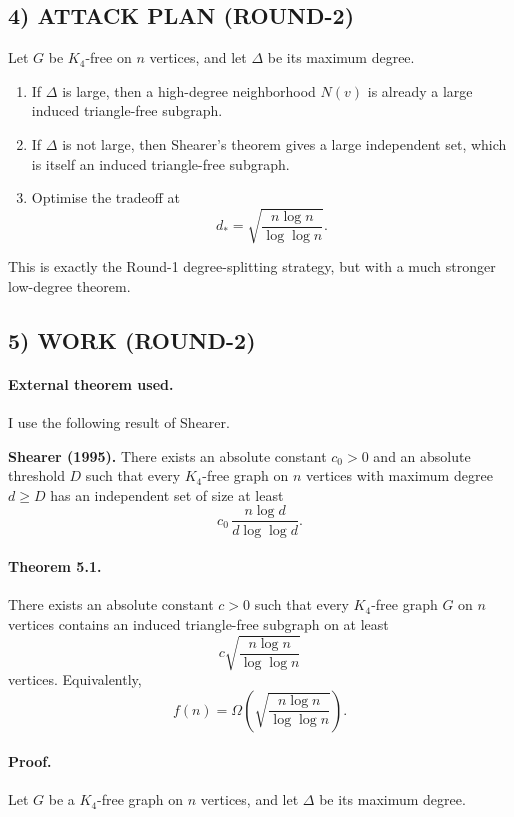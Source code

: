 \subsection*{4) ATTACK PLAN (ROUND-2)}

Let $G$ be $K_4$-free on $n$ vertices, and let $\Delta$ be its maximum degree.

\begin{enumerate}
\item If $\Delta$ is large, then a high-degree neighborhood $N(v)$ is already a large induced triangle-free subgraph.
\item If $\Delta$ is not large, then Shearer's theorem gives a large independent set, which is itself an induced triangle-free subgraph.
\item Optimise the tradeoff at
\[
d_\ast=\sqrt{\frac{n\log n}{\log\log n}}.
\]
\end{enumerate}

This is exactly the Round-1 degree-splitting strategy, but with a much stronger low-degree theorem.

\subsection*{5) WORK (ROUND-2)}

\paragraph{External theorem used.}
I use the following result of Shearer.

\medskip
\noindent
\textbf{Shearer (1995).}
There exists an absolute constant $c_0>0$ and an absolute threshold $D$ such that every $K_4$-free graph on $n$ vertices with maximum degree $d\ge D$ has an independent set of size at least
\[
c_0\,\frac{n\log d}{d\log\log d}.
\]

\paragraph{Theorem 5.1.}
There exists an absolute constant $c>0$ such that every $K_4$-free graph $G$ on $n$ vertices contains an induced triangle-free subgraph on at least
\[
c\sqrt{\frac{n\log n}{\log\log n}}
\]
vertices. Equivalently,
\[
f(n)=\Omega\!\left(\sqrt{\frac{n\log n}{\log\log n}}\right).
\]

\paragraph{Proof.}
Let $G$ be a $K_4$-free graph on $n$ vertices, and let $\Delta$ be its maximum degree.

